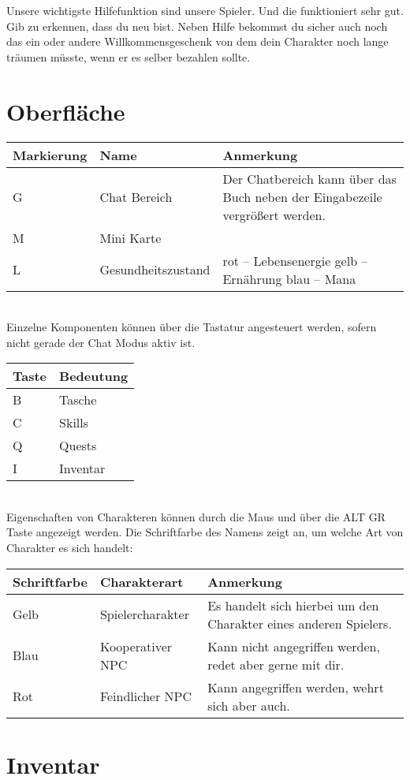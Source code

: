 \documentclass[a4paper,11pt]{book}
\begin{document}
Unsere wichtigste Hilfefunktion sind unsere Spieler. Und die funktioniert sehr gut. Gib zu erkennen, dass du neu bist. Neben Hilfe bekommst du sicher auch noch das ein oder andere Willkommensgeschenk von dem dein Charakter noch lange träumen müsste, wenn er es selber bezahlen sollte.

\section{Oberfläche}
\begin{tabular}{ l l p{9cm} }
Markierung & Name & Anmerkung \\ \hline 
G  & Chat Bereich & Der Chatbereich kann über das Buch neben der Eingabezeile vergrößert werden.\\

M & Mini Karte & \\

L & Gesundheitszustand & rot – Lebensenergie gelb – Ernährung blau – Mana \\
\end{tabular}
\\

Einzelne Komponenten können über die Tastatur angesteuert werden, sofern nicht gerade der Chat Modus aktiv ist.

\begin{tabular}{ l l}
Taste & Bedeutung \\ \hline
B  &Tasche \\
C  &Skills \\
Q  &Quests \\
I  & Inventar
\end{tabular}
\\

Eigenschaften von Charakteren können durch die Maus und über die ALT GR Taste angezeigt werden. Die Schriftfarbe des Namens zeigt an, um welche Art von Charakter es sich handelt:
\begin{tabular}{ l l p{9cm}}
Schriftfarbe & Charakterart & Anmerkung \\ \hline
Gelb  & Spielercharakter & Es handelt sich hierbei um den Charakter eines anderen Spielers. \\
Blau  & Kooperativer NPC & Kann nicht angegriffen werden, redet aber gerne mit dir. \\
Rot  & Feindlicher NPC & Kann angegriffen werden, wehrt sich aber auch.
\end{tabular}

\section{Inventar}
\end{document}
